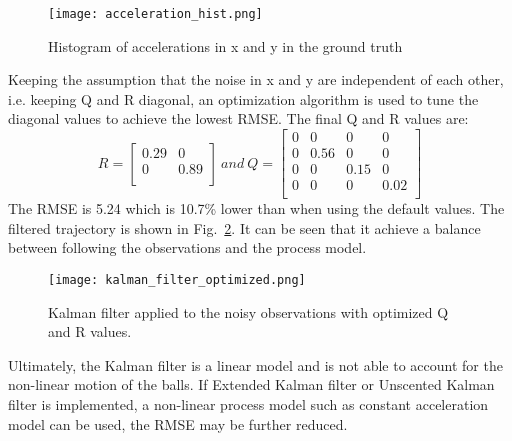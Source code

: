 \documentclass{report}
\begin{document}
\begin{figure}[ht]
    \centering
    \texttt{[image: acceleration\_hist.png]}
    \caption{Histogram of accelerations in x and y in the ground truth}
    \label{fig:acceleration_hist}
\end{figure}

Keeping the assumption that the noise in x and y are independent of each other, i.e. keeping Q and R diagonal, an optimization algorithm is used to tune the diagonal values to achieve the lowest RMSE. The final Q and R values are:
\begin{equation}
R = \begin{bmatrix} 
    0.29 & 0    \\
    0    & 0.89 \\
\end{bmatrix}\ and\ Q = \begin{bmatrix} 
    0 & 0    & 0    & 0    \\
    0 & 0.56 & 0    & 0    \\
    0 & 0    & 0.15 & 0    \\
    0 & 0    & 0    & 0.02 \\
\end{bmatrix}
\end{equation}
The RMSE is 5.24 which is 10.7\% lower than when using the default values. The filtered trajectory is shown in Fig.~\ref{fig:kalman_filter_optimized}. It can be seen that it achieve a balance between following the observations and the process model.

\begin{figure}[ht]
    \centering
    \texttt{[image: kalman\_filter\_optimized.png]}
    \caption{Kalman filter applied to the noisy observations with optimized Q and R values.}
    \label{fig:kalman_filter_optimized}
\end{figure}

Ultimately, the Kalman filter is a linear model and is not able to account for the non-linear motion of the balls. If Extended Kalman filter\cite{julierNewExtensionKalman1997} or Unscented Kalman filter\cite{wanUnscentedKalmanFilter2000} is implemented, a non-linear process model  such as constant acceleration model can be used, the RMSE may be further reduced.

\printbibliography
\end{document}
